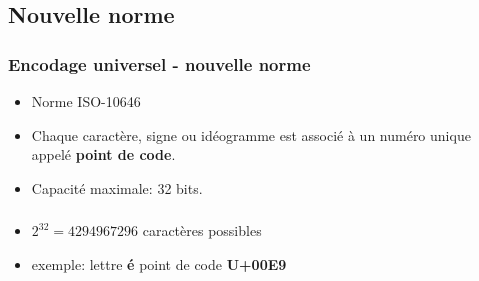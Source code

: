 \documentclass[svgnames,11pt]{beamer}
\begin{document}
\subsection{Nouvelle norme}
\begin{frame}
    \frametitle{Encodage universel - nouvelle norme}
\begin{itemize}
    \item Norme ISO-10646
    \item Chaque caractère, signe ou idéogramme est associé à un numéro unique appelé \textbf{point de code}.
    \item Capacité maximale: 32 bits.
\end{itemize}
    
\end{frame}
\begin{frame}
    \frametitle{}

    \begin{itemize}
        \item $2^{32} = 4294967296$ caractères possibles
        \item exemple: lettre \textbf{é} point de code \textbf{U+00E9}
    \end{itemize}

\end{frame}
\end{document}
